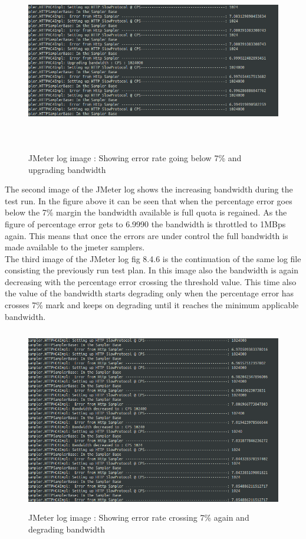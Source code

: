 \documentclass[12pt]{book}
\begin{document}
  \begin{figure}[H]
   \centering
   \includegraphics[width=15cm, height=8cm]{images/dbt_5}
   \caption{JMeter log image : Showing error rate going below 7\% and upgrading bandwidth \label{fig:fig62_JMeter}}
  \end{figure}
  
  The second image of the JMeter log shows the increasing bandwidth during the test run. In the
  figure above it can be seen that when the percentage error goes below the 7\% margin the
  bandwidth available is full quota is regained. As the figure of percentage error gets to 6.9990 %
  the bandwidth is throttled to 1MBps again. This means that once the errors are under control the
  full bandwidth is made available to the jmeter samplers.\\
  The third image of the JMeter log fig 8.4.6 is the continuation of the same log file consisting the
  previously run test plan. In this image also the bandwidth is again decreasing with the percentage
  error crossing the threshold value. This time also the value of the bandwidth starts degrading
  only when the percentage error has crosses 7\% mark and keeps on degrading until it reaches the
  minimum applicable bandwidth.\\
  
  
  \begin{figure}[H]
   \centering
   \includegraphics[width=15cm, height=8cm]{images/dbt_6}
   \caption{JMeter log image : Showing error rate crossing 7\% again and degrading bandwidth \label{fig:fig63_JMeter}}
  \end{figure}
  
\end{document}
